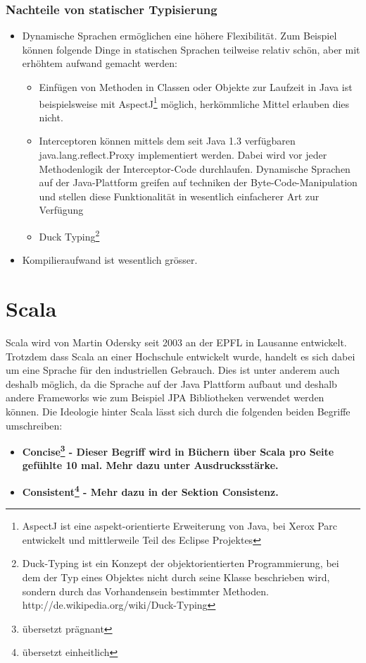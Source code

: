 \subsubsection{Nachteile von statischer Typisierung}
\begin{itemize}
\item Dynamische Sprachen erm\"oglichen eine h\"ohere Flexibilit\"at. Zum Beispiel k\"onnen folgende Dinge in statischen Sprachen teilweise relativ sch\"on, aber mit erh\"ohtem aufwand gemacht werden:
\begin{itemize}
\item Einf\"ugen von Methoden in Classen oder Objekte zur Laufzeit in Java ist beispielsweise mit AspectJ\footnote{AspectJ ist eine aspekt-orientierte Erweiterung von Java, bei Xerox Parc entwickelt und mittlerweile Teil des Eclipse Projektes} m\"oglich, herk\"ommliche Mittel erlauben dies nicht.
\item Interceptoren k\"onnen mittels dem seit Java 1.3 verf\"ugbaren java.lang.reflect.Proxy implementiert werden. Dabei wird vor jeder Methodenlogik der Interceptor-Code durchlaufen. Dynamische Sprachen auf der Java-Plattform greifen auf techniken der Byte-Code-Manipulation und stellen diese Funktionalit\"at in wesentlich einfacherer Art zur Verf\"ugung
\item Duck Typing\footnote{Duck-Typing ist ein Konzept der objektorientierten Programmierung, bei dem der Typ eines Objektes nicht durch seine Klasse beschrieben wird, sondern durch das Vorhandensein bestimmter Methoden. http://de.wikipedia.org/wiki/Duck-Typing}
\end{itemize}
\item Kompilieraufwand ist wesentlich gr\"osser.
\end{itemize}


\section{Scala}\label{einarbeitung:scala}
Scala wird von Martin Odersky seit 2003 an der EPFL in Lausanne entwickelt. Trotzdem dass Scala an einer Hochschule entwickelt wurde, handelt es sich dabei um eine Sprache f\"ur den industriellen Gebrauch. Dies ist unter anderem auch deshalb m\"oglich, da die Sprache auf der Java Plattform aufbaut und deshalb andere Frameworks wie zum Beispiel JPA Bibliotheken verwendet werden k\"onnen. Die Ideologie hinter Scala l\"asst sich durch die folgenden beiden Begriffe umschreiben:
\begin{itemize}
\item \bf{Concise\footnote{\"ubersetzt pr\"agnant}} - Dieser Begriff wird in B\"uchern \"uber Scala pro Seite gef\"uhlte 10 mal. Mehr dazu unter Ausdrucksst\"arke.
\item \bf{Consistent\footnote{\"ubersetzt einheitlich}} - Mehr dazu in der Sektion Consistenz.
\end{itemize}

